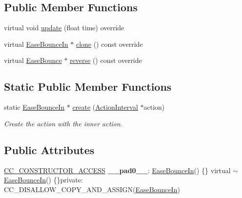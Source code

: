 \subsection*{Public Member Functions}
\begin{DoxyCompactItemize}
\item 
virtual void \hyperlink{classEaseBounceIn_a3b912af264515d06f8671179b17ae729}{update} (float time) override
\item 
virtual \hyperlink{classEaseBounceIn}{Ease\+Bounce\+In} $\ast$ \hyperlink{classEaseBounceIn_a36d193006cd57d915b764a7fc52d2768}{clone} () const override
\item 
virtual \hyperlink{classEaseBounce}{Ease\+Bounce} $\ast$ \hyperlink{classEaseBounceIn_aac86ecee50c41de2e0b4047cf8047949}{reverse} () const override
\end{DoxyCompactItemize}
\subsection*{Static Public Member Functions}
\begin{DoxyCompactItemize}
\item 
static \hyperlink{classEaseBounceIn}{Ease\+Bounce\+In} $\ast$ \hyperlink{classEaseBounceIn_aa61493b1bd655620559bf40e73b96f57}{create} (\hyperlink{classActionInterval}{Action\+Interval} $\ast$action)
\begin{DoxyCompactList}\small\item\em Create the action with the inner action. \end{DoxyCompactList}\end{DoxyCompactItemize}
\subsection*{Public Attributes}
\begin{DoxyCompactItemize}
\item 
\mbox{\label{classEaseBounceIn_a9615d28e99964afc2610167f6b106e07}} 
\hyperlink{_2cocos2d_2cocos_2base_2ccConfig_8h_a25ef1314f97c35a2ed3d029b0ead6da0}{C\+C\+\_\+\+C\+O\+N\+S\+T\+R\+U\+C\+T\+O\+R\+\_\+\+A\+C\+C\+E\+SS} {\bfseries \+\_\+\+\_\+pad0\+\_\+\+\_\+}\+: \hyperlink{classEaseBounceIn}{Ease\+Bounce\+In}() \{\} virtual $\sim$\hyperlink{classEaseBounceIn}{Ease\+Bounce\+In}() \{\}private\+: C\+C\+\_\+\+D\+I\+S\+A\+L\+L\+O\+W\+\_\+\+C\+O\+P\+Y\+\_\+\+A\+N\+D\+\_\+\+A\+S\+S\+I\+GN(\hyperlink{classEaseBounceIn}{Ease\+Bounce\+In})
\end{DoxyCompactItemize}
